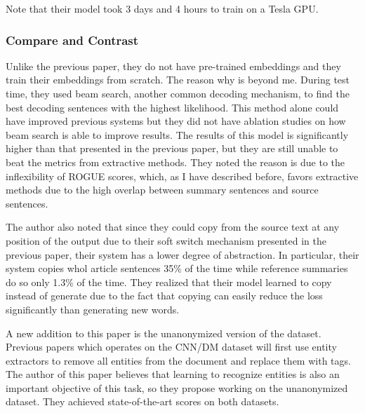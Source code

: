 \documentclass[11pt,a4paper]{article}
\begin{document}
Note that their model took 3 days and 4 hours to train on a Tesla GPU. 

\subsubsection{Compare and Contrast}
Unlike the previous paper, they do not have pre-trained embeddings and they train their embeddings from scratch. The reason why is beyond me. During test time, they used beam search, another common decoding mechanism, to find the best decoding sentences with the highest likelihood. This method alone could have improved previous systems but they did not have ablation studies on how beam search is able to improve results. The results of this model is significantly higher than that presented in the previous paper, but they are still unable to beat the metrics from extractive methods. They noted the reason is due to the inflexibility of ROGUE scores, which, as I have described before, favors extractive methods due to the high overlap between summary sentences and source sentences. 

The author also noted that since they could copy from the source text at any position of the output due to their soft switch mechanism presented in the previous paper, their system has a lower degree of abstraction. In particular, their system copies whol article sentences 35\% of the time while reference summaries do so only 1.3\% of the time. They realized that their model learned to copy instead of generate due to the fact that copying can easily reduce the loss significantly than generating new words.

A new addition to this paper is the unanonymized version of the dataset. Previous papers which operates on the CNN/DM dataset will first use entity extractors to remove all entities from the document and replace them with tags. The author of this paper believes that learning to recognize entities is also an important objective of this task, so they propose working on the unanonymized dataset. They achieved state-of-the-art scores on both datasets.
\end{document}
